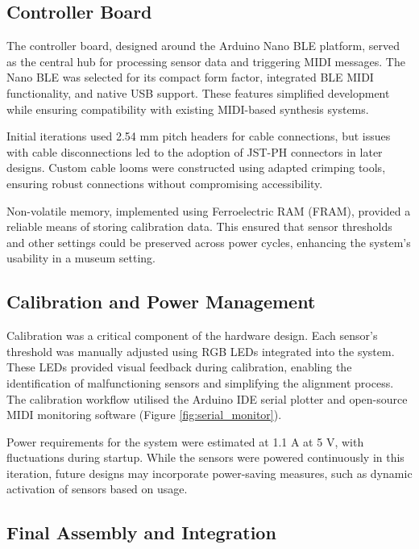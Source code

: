 \subsection{Controller Board}\label{controller-board}

The controller board, designed around the Arduino Nano BLE platform, served as the central hub for processing sensor data and triggering MIDI messages. The Nano BLE was selected for its compact form factor, integrated BLE MIDI functionality, and native USB support. These features simplified development while ensuring compatibility with existing MIDI-based synthesis systems.

Initial iterations used 2.54 mm pitch headers for cable connections, but issues with cable disconnections led to the adoption of JST-PH connectors in later designs. Custom cable looms were constructed using adapted crimping tools, ensuring robust connections without compromising accessibility.

Non-volatile memory, implemented using Ferroelectric RAM (FRAM), provided a reliable means of storing calibration data. This ensured that sensor thresholds and other settings could be preserved across power cycles, enhancing the system's usability in a museum setting.

\subsection{Calibration and Power Management}\label{calibration}

Calibration was a critical component of the hardware design. Each sensor's threshold was manually adjusted using RGB LEDs integrated into the system. These LEDs provided visual feedback during calibration, enabling the identification of malfunctioning sensors and simplifying the alignment process. The calibration workflow utilised the Arduino IDE serial plotter and open-source MIDI monitoring software (Figure \ref{fig:serial_monitor}).

Power requirements for the system were estimated at 1.1 A at 5 V, with fluctuations during startup. While the sensors were powered continuously in this iteration, future designs may incorporate power-saving measures, such as dynamic activation of sensors based on usage.

\subsection{Final Assembly and Integration}

